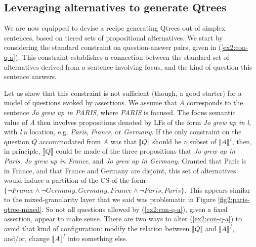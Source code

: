 \subsection{Leveraging alternatives to generate Qtrees}
We are now equipped to devise a recipe generating Qtrees out of simplex sentences, based on tiered sets of propositional alternatives. We start by considering the standard constraint on question-answer pairs, given in (\ref{ex2:con-q-a}). This constraint establishes a connection between the standard set of alternatives derived from a sentence involving focus, and the kind of question this sentence answers.

\begin{exe}
	\label{ex2:con-q-a}
\end{exe}

Let us show that this constraint is not sufficient (though, a good starter) for a model of questions evoked by assertions. We assume that $A$ corresponds to the sentence \textit{Jo grew up in PARIS}, where \textit{PARIS} is focused. The focus semantic value of $A$ then involves propositions denoted by LFs of the form \textit{Jo grew up in l}, with \textit{l} a location, e.g. \textit{Paris}, \textit{France}, or \textit{Germany}. If the only constraint on the question $Q$ accommodated from $A$ was that $\llbracket Q \rrbracket$ should be a subset of  $\llbracket A\rrbracket^f$, then, in principle, $\llbracket Q \rrbracket$ could be made of the three propositions that \textit{Jo grew up in Paris}, \textit{Jo grew up in France}, and \textit{Jo grew up in Germany}. Granted that Paris is in France, and that France and Germany are disjoint, this set of alternatives would induce a partition of the CS of the form $\lbrace \neg \textit{France} \wedge \neg \textit{Germany}, \textit{Germany}, \textit{France} \wedge \neg \textit{Paris}, \textit{Paris}\rbrace$. This appears similar to the mixed-granularity layer that we said was problematic in Figure \ref{fig2:paris-qtree-mixed}. So not all questions allowed by (\ref{ex2:con-q-a}), given a fixed assertion, appear to make sense. There are two ways to alter (\ref{ex2:con-q-a}) to avoid that kind of configuration: modify the relation between $\llbracket Q\rrbracket$ and $\llbracket A \rrbracket^f$, and/or, change $\llbracket A \rrbracket^f$ into something else.

